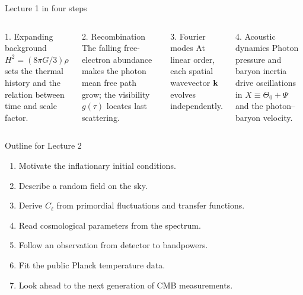 
\begin{frame}{Lecture 1 in four steps}
\begin{columns}[T]
\begin{block}{1. Expanding background}
$H^2=(8\pi G/3)\rho$ sets the thermal history and the relation between time and scale factor.
\end{block}
\begin{block}{2. Recombination}
The falling free-electron abundance makes the photon mean free path grow; the visibility $g(\tau)$ locates last scattering.
\end{block}
\begin{block}{3. Fourier modes}
At linear order, each spatial wavevector $\mathbf k$ evolves independently.
\end{block}
\begin{block}{4. Acoustic dynamics}
Photon pressure and baryon inertia drive oscillations in $X\equiv\Theta_0+\Psi$ and the photon--baryon velocity.
\end{block}
\end{columns}
\end{frame}

\begin{frame}{Outline for Lecture 2}
\begin{enumerate}
\item Motivate the inflationary initial conditions.
\item Describe a random field on the sky.
\item Derive $C_\ell$ from primordial fluctuations and transfer functions.
\item Read cosmological parameters from the spectrum.
\item Follow an observation from detector to bandpowers.
\item Fit the public Planck temperature data.
\item Look ahead to the next generation of CMB measurements.
\end{enumerate}
\end{frame}

